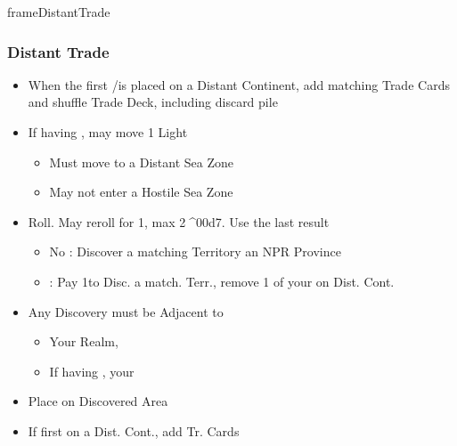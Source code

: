 \documentclass[10pt]{article}
\newlength{\fhDistantTrade} \setlength\fhDistantTrade{4\baselineskip}
\begin{document}
\begin{dynamiccontents*}{frameDistantTrade}\begin{eubox}{\fhDistantTrade}
	\subsubsection*{Distant Trade }
	\begin{itemize}
		\item When the first \claim/\dnpr is placed on a Distant Continent, add matching Trade Cards and shuffle Trade Deck, including discard pile
	\end{itemize}
\end{eubox}\end{dynamiccontents*}

\begin{itemize}
	\item If having , may move 1 Light \ship
	\begin{itemize}
		\item Must move to a Distant Sea Zone
		\item May not enter a Hostile Sea Zone
	\end{itemize}
	\item Roll. May reroll for 1\diplopower, max 2^^^^00d7. Use the last result
	\begin{itemize}
		\item No \skull: Discover a matching Territory  an NPR Province  \town {} \vassal
		\item \skull: Pay 1\diplopower to Disc. a match. Terr.,  remove 1 of your \ships on Dist. Cont.
	\end{itemize}
	\item Any Discovery must be Adjacent to
	\begin{itemize}
		\item Your Realm, 
		\item If having , your \ship
	\end{itemize}
	\item Place \claim on Discovered Area
	\item If first \claim on a Dist. Cont., add Tr. Cards
\end{itemize}
\end{document}
